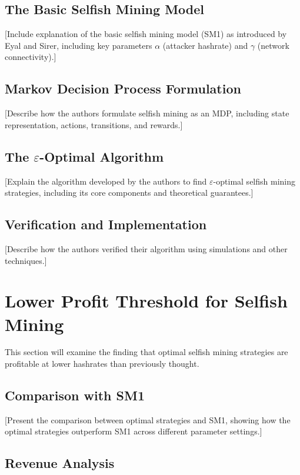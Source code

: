 \documentclass[conference]{IEEEtran}
\begin{document}
\subsection{The Basic Selfish Mining Model}

[Include explanation of the basic selfish mining model (SM1) as introduced by Eyal and Sirer, including key parameters $\alpha$ (attacker hashrate) and $\gamma$ (network connectivity).]

\subsection{Markov Decision Process Formulation}

[Describe how the authors formulate selfish mining as an MDP, including state representation, actions, transitions, and rewards.]

\subsection{The $\varepsilon$-Optimal Algorithm}

[Explain the algorithm developed by the authors to find $\varepsilon$-optimal selfish mining strategies, including its core components and theoretical guarantees.]

\subsection{Verification and Implementation}

[Describe how the authors verified their algorithm using simulations and other techniques.]

\section{Lower Profit Threshold for Selfish Mining}

This section will examine the finding that optimal selfish mining strategies are profitable at lower hashrates than previously thought.

\subsection{Comparison with SM1}

[Present the comparison between optimal strategies and SM1, showing how the optimal strategies outperform SM1 across different parameter settings.]

\subsection{Revenue Analysis}
\end{document}
